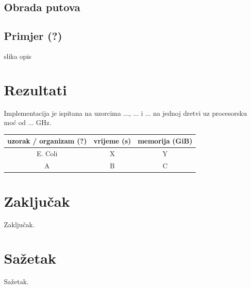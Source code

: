 \documentclass[times, utf8, seminar, numeric]{fer}
\begin{document}
\section{Obrada putova}


\section{Primjer (?)}
slika
opis

\chapter{Rezultati}
Implementacija je ispitana na uzorcima ..., ... i ... na jednoj dretvi uz procesorsku moć od ... GHz.

\begin{center}
\begin{tabular}{|c||c|c|}
	\hline
	uzorak / organizam (?) & vrijeme (s) & memorija (GiB)\\
	\hline
	\hline
	E. Coli & X & Y \\
	\hline
	A & B & C \\
	\hline
\end{tabular}
\end{center}
\chapter{Zaključak}
Zaključak.




\chapter{Sažetak}
Sažetak.
\end{document}
